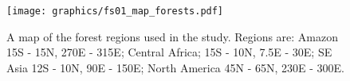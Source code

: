 \documentclass[gmd, manuscript]{copernicus} %
\begin{document}



\begin{figure}[t]
\texttt{[image: graphics/fs01\_map\_forests.pdf]}
\caption{A map of the forest regions used in the study. Regions are: Amazon 15\textdegree S - 15\textdegree N, 270\textdegree E - 315\textdegree E; Central Africa; 15\textdegree S - 10\textdegree N, 7.5\textdegree E - 30\textdegree E; SE Asia 12\textdegree S - 10\textdegree N, 90\textdegree E - 150\textdegree E; North America 45\textdegree N - 65\textdegree N, 230\textdegree E - 300\textdegree E.}
\label{fig:map_forests}
\end{figure}
\end{document}
